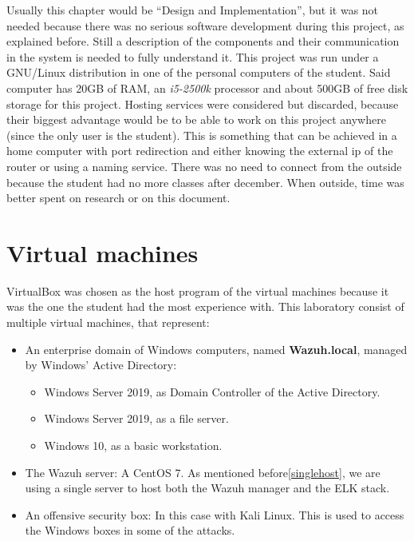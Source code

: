 Usually this chapter would be ``Design and Implementation'', but it was not needed because there was no serious software development during this project, as explained before.
Still a description of the components and their communication in the system is needed to fully understand it.
\linej
\linej
This project was run under a GNU/Linux distribution in one of the personal computers of the student.
Said computer has 20GB of RAM, an \textit{i5-2500k} processor and about 500GB of free disk storage for this project.
\linej
\linej
Hosting services were considered but discarded, because their biggest advantage would be to be able to work on this project anywhere (since the only user is the student). This is something that can be achieved in a home computer with port redirection and either knowing the external ip of the router or using a naming service. There was no need to connect from the outside because the student had no more classes after december. When outside, time was better spent on research or on this document.

\section{Virtual machines}
VirtualBox was chosen as the host program of the virtual machines because it was the one the student had the most experience with.
\linej
This laboratory consist of multiple virtual machines, that represent:
\begin{itemize}
	\item An enterprise domain of Windows computers, named \textbf{Wazuh.local}, managed by Windows' Active Directory:
		\begin{itemize}
			\item Windows Server 2019, as Domain Controller of the Active Directory.
			\item Windows Server 2019, as a file server.
			\item Windows 10, as a basic workstation.
		\end{itemize}
	\item The Wazuh server: A CentOS 7. As mentioned before\ref{singlehost}, we are using a single server to host both the Wazuh manager and the ELK stack.
	\item An offensive security box: In this case with Kali Linux. This is used to access the Windows boxes in some of the attacks.
\end{itemize}


